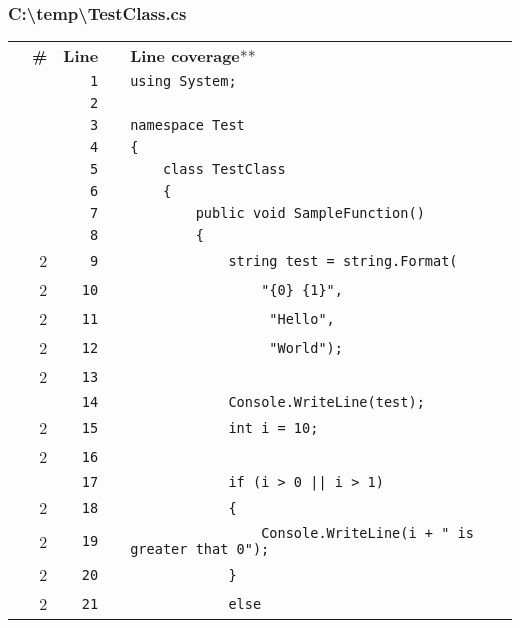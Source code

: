 \documentclass[a4paper,landscape,10pt]{article}
\begin{document}
\subsubsection{C:\textbackslash temp\textbackslash TestClass.cs}
\begin{longtable}[l]{lrrll}
 & \textbf{\#} & \textbf{Line} & & \textbf{Line coverage}** \\
\cellcolor{gray} &  & \verb~1~ & & \verb~using System;~\\
\cellcolor{gray} &  & \verb~2~ & & \verb~~\\
\cellcolor{gray} &  & \verb~3~ & & \verb~namespace Test~\\
\cellcolor{gray} &  & \verb~4~ & & \verb~{~\\
\cellcolor{gray} &  & \verb~5~ & & \verb~    class TestClass~\\
\cellcolor{gray} &  & \verb~6~ & & \verb~    {~\\
\cellcolor{gray} &  & \verb~7~ & & \verb~        public void SampleFunction()~\\
\cellcolor{gray} &  & \verb~8~ & & \verb~        {~\\
\cellcolor{green} & 2 & \verb~9~ & & \verb~            string test = string.Format(~\\
\cellcolor{green} & 2 & \verb~10~ & & \verb~                "{0} {1}",~\\
\cellcolor{green} & 2 & \verb~11~ & & \verb~                 "Hello",~\\
\cellcolor{green} & 2 & \verb~12~ & & \verb~                 "World");~\\
\cellcolor{green} & 2 & \verb~13~ & & \verb~~\\
\cellcolor{gray} &  & \verb~14~ & & \verb~            Console.WriteLine(test);~\\
\cellcolor{green} & 2 & \verb~15~ & & \verb~            int i = 10;~\\
\cellcolor{green} & 2 & \verb~16~ & & \verb~~\\
\cellcolor{gray} &  & \verb~17~ & & \verb~            if (i > 0 || i > 1)~\\
\cellcolor{orange} & 2 & \verb~18~ & & \verb~            {~\\
\cellcolor{green} & 2 & \verb~19~ & & \verb~                Console.WriteLine(i + " is greater that 0");~\\
\cellcolor{green} & 2 & \verb~20~ & & \verb~            }~\\
\cellcolor{green} & 2 & \verb~21~ & & \verb~            else~\\

\end{longtable}
\end{document}
